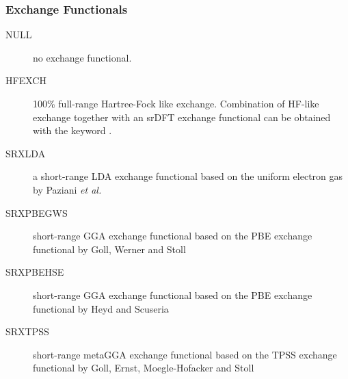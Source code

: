 \subsubsection{Exchange Functionals}
\providecommand\exfn[1]{#1}
\begin{description}

\item[NULL] no exchange functional.

\item[HFEXCH] 100\% full-range Hartree-Fock like exchange. Combination of HF-like exchange together with an srDFT exchange functional can be obtained with the keyword .

\item[SRXLDA] a short-range LDA exchange functional based on the uniform electron gas by Paziani \textit{et al.}~\cite{srdft:LDAERF}

\item[SRXPBEGWS] short-range GGA exchange functional based on the PBE exchange functional by Goll, Werner and Stoll~\cite{srdft:PBEGWSa,srdft:PBEGWSb}

\item[SRXPBEHSE] short-range GGA exchange functional based on the PBE exchange functional by Heyd and Scuseria~\cite{srdft:Heyd2004}

\item[SRXTPSS] short-range metaGGA exchange functional based on the TPSS exchange functional by Goll, Ernst, Moegle-Hofacker and Stoll~\cite{srdft:srTPSS}

\end{description}

